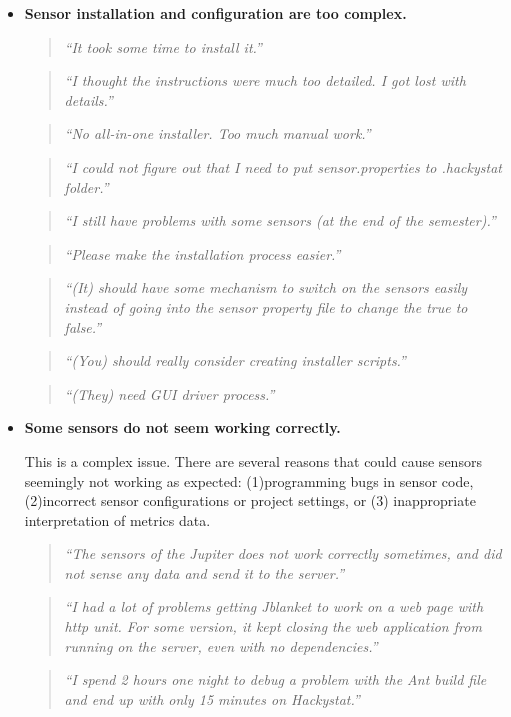 \begin{itemize}
 
  \item \textbf{Sensor installation and configuration are too complex.}
    \begin{quote} \textit{``It took some time to install it.''} \end{quote}
    \begin{quote} \textit{``I thought the instructions were much too 
           detailed. I got lost with details.''} \end{quote}
    \begin{quote} \textit{``No all-in-one installer. Too much manual 
           work.''} \end{quote}  
    \begin{quote} \textit{``I could not figure out that I need to put 
           sensor.properties to .hackystat folder.''} \end{quote}
    \begin{quote} \textit{``I still have problems with some sensors
           (at the end of the semester).''} \end{quote} 
    \begin{quote} \textit{``Please make the installation process 
           easier.''} \end{quote}
    \begin{quote} \textit{``(It) should have some mechanism to switch on 
           the sensors easily instead of going into the sensor property file 
           to change the true to false.''} \end{quote}
    \begin{quote} \textit{``(You) should really consider creating 
           installer scripts.''} \end{quote}  
    \begin{quote} \textit{``(They) need GUI driver process.''} \end{quote}           
           

  \item \textbf{Some sensors do not seem working correctly.}  
    
    This is a complex issue. There are several reasons that could cause sensors seemingly not working as expected:
    (1)programming bugs in sensor code, 
    (2)incorrect sensor configurations or project settings, 
    or (3) inappropriate interpretation of metrics data.
  
    \begin{quote} \textit{``The sensors of the Jupiter does not work 
           correctly sometimes, and did not sense any data and send 
           it to the server.''} \end{quote}
    \begin{quote} \textit{``I had a lot of problems getting Jblanket 
           to work on a web page with http unit. For some version, 
           it kept closing the web application from running on the server, 
           even with no dependencies.''} \end{quote}  
    \begin{quote} \textit{``I spend 2 hours one night to debug a problem 
           with the Ant build file and end up with only 15 minutes
           on Hackystat.''} \end{quote}



\end{itemize}
